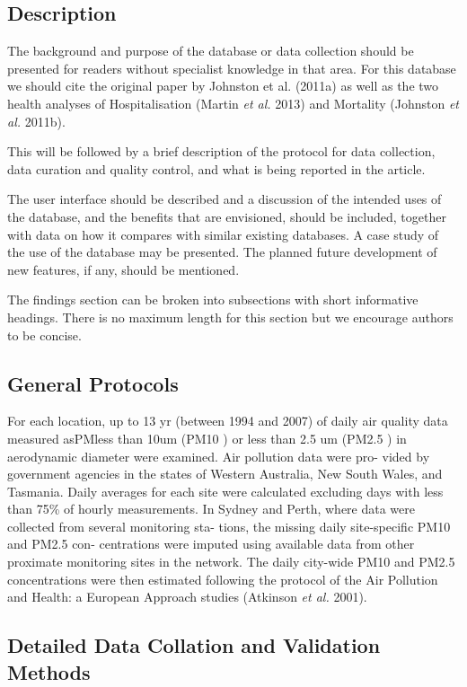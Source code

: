 \subsection{Description}\label{description}

The background and purpose of the database or data collection should be
presented for readers without specialist knowledge in that area. For
this database we should cite the original paper by Johnston et al.
(2011a) as well as the two health analyses of Hospitalisation (Martin
\emph{et al.} 2013) and Mortality (Johnston \emph{et al.} 2011b).

This will be followed by a brief description of the protocol for data
collection, data curation and quality control, and what is being
reported in the article.

The user interface should be described and a discussion of the intended
uses of the database, and the benefits that are envisioned, should be
included, together with data on how it compares with similar existing
databases. A case study of the use of the database may be presented. The
planned future development of new features, if any, should be mentioned.

The findings section can be broken into subsections with short
informative headings. There is no maximum length for this section but we
encourage authors to be concise.

\subsection{General Protocols}\label{general-protocols}

For each location, up to 13 yr (between 1994 and 2007) of daily air
quality data measured asPMless than 10um (PM10 ) or less than 2.5 um
(PM2.5 ) in aerodynamic diameter were examined. Air pollution data were
pro- vided by government agencies in the states of Western Australia,
New South Wales, and Tasmania. Daily averages for each site were
calculated excluding days with less than 75\% of hourly measurements. In
Sydney and Perth, where data were collected from several monitoring sta-
tions, the missing daily site-specific PM10 and PM2.5 con- centrations
were imputed using available data from other proximate monitoring sites
in the network. The daily city-wide PM10 and PM2.5 concentrations were
then estimated following the protocol of the Air Pollution and Health: a
European Approach studies (Atkinson \emph{et al.} 2001).

\subsection{Detailed Data Collation and Validation
Methods}\label{detailed-data-collation-and-validation-methods}

